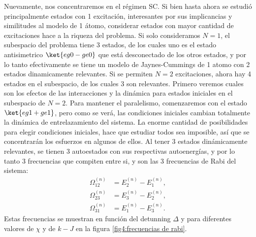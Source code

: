Nuevamente, nos concentraremos en el régimen SC. Si bien hasta ahora se estudió principalmente estados con 1 excitación, interesantes por sus implicancias y similitudes al modelo de 1 átomo, considerar estados con mayor cantidad de excitaciones hace a la riqueza del problema. Si solo consideramos $N=1$, el subespacio del problema tiene 3 estados, de los cuales uno es el estado antisimetrico $\ket{eg0-ge0}$ que está desconectado de los otros estados, y por lo tanto efectivamente se tiene un modelo de Jaynes-Cummings de 1 atomo con 2 estados dinamicamente relevantes. Si se permiten $N=2$ excitaciones, ahora hay 4 estados en el subespacio, de los cuales 3 son relevantes. Primero veremos cuales son los efectos de las interacciones y la dinámica para estados iniciales en el subespacio de $N=2$. Para mantener el paralelismo, comenzaremos con el estado $\ket{eg1+ge1}$, pero como se verá, las condiciones iniciales cambian totalmente la dinámica de entrelazamiento del sistema. La enorme cantidad de posibilidades para elegir condiciones iniciales, hace que estudiar todos sea imposible, así que se  concentrarán los esfuerzos en algunos de ellos.
Al tener 3 estados dinámicamente relevantes, se tienen 3 autoestados con sus respectivas autoenergías, y por lo tanto 3 frecuencias que compiten entre si, y son las 3 frecuencias de Rabi del sistema:
\begin{equation}
    \begin{aligned}
        \Omega^{(n)}_{12} &= E^{(n)}_2-E^{(n)}_1 ,\\
        \Omega^{(n)}_{23} &=E^{(n)}_3-E^{(n)}_2, \\
        \Omega^{(n)}_{31} &= E^{(n)}_1-E^{(n)}_3 .        
    \end{aligned}
    \label{ec4:frecuencias de rabi}
\end{equation}
Estas frecuencias se muestran en función del detunning $\Delta$ y para diferentes valores de $\chi$ y de $k-J$ en la figura \ref{fig4:frecuencias de rabi}.
